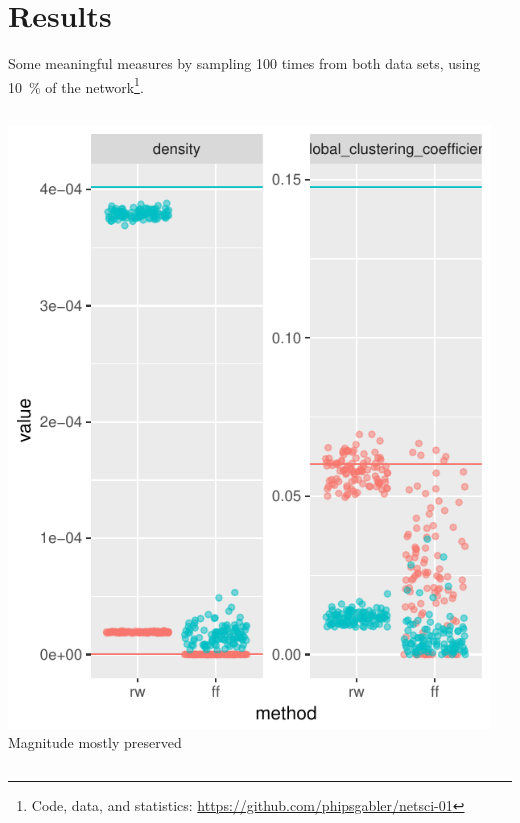 \documentclass{beamer}
\begin{document}
\section{Results}
\begin{frame}
  Some meaningful measures by sampling 100 times from both data sets, using 10~\% of the
  network\footnote{Code, data, and statistics:
    \protect\url{https://github.com/phipsgabler/netsci-01}}.  \vspace{1ex}
  \begin{columns}
    \begin{column}[t]{0.4\textwidth}
      \includegraphics[width=\textwidth]{fig/sampled-ok}\\
      Magnitude mostly preserved
    \end{column}
    \begin{column}[t]{0.6\textwidth}

\end{column}
\end{columns}
\end{frame}
\end{document}
